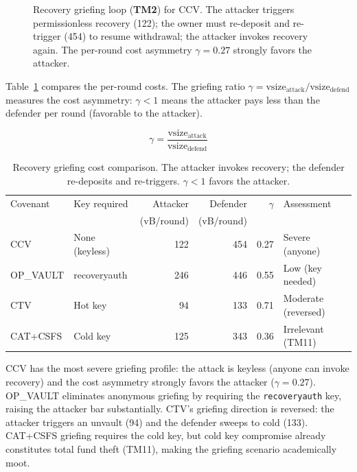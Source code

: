 \begin{figure}[t]
{}
\caption{Recovery griefing loop (\textbf{TM2}) for CCV. The attacker triggers
permissionless recovery (122\vB{}); the owner must re-deposit and re-trigger
(454\vB{}) to resume withdrawal; the attacker invokes recovery again. The
per-round cost asymmetry $\gamma = 0.27$ strongly favors the attacker.}
\label{fig:recovery_griefing}
\end{figure}

Table~\ref{tab:griefing_costs} compares the per-round costs. The griefing ratio
$\gamma = \text{vsize}_{\text{attack}} / \text{vsize}_{\text{defend}}$ measures the
cost asymmetry: $\gamma < 1$ means the attacker pays less than the defender per
round (favorable to the attacker).

\begin{equation} \label{eq:griefing_ratio}
\gamma = \frac{\text{vsize}_{\text{attack}}}{\text{vsize}_{\text{defend}}}
\end{equation}

\begin{table}[t]
\centering
\caption{Recovery griefing cost comparison. The attacker invokes recovery; the
defender re-deposits and re-triggers. $\gamma < 1$ favors the attacker.}
\label{tab:griefing_costs}
\small
\begin{tabular}{@{}llrrrl@{}}
\toprule
Covenant & Key required & Attacker & Defender & $\gamma$ & Assessment \\
         &              & (vB/round) & (vB/round) & & \\
\midrule
CCV       & None (keyless)  & 122 & 454 & 0.27 & Severe (anyone) \\
OP\_VAULT & recoveryauth    & 246 & 446 & 0.55 & Low (key needed) \\
CTV       & Hot key         & 94  & 133 & 0.71 & Moderate (reversed) \\
CAT+CSFS  & Cold key        & 125 & 343 & 0.36 & Irrelevant (TM11) \\
\bottomrule
\end{tabular}
\end{table}

CCV has the most severe griefing profile: the attack is keyless (anyone can invoke
recovery) and the cost asymmetry strongly favors the attacker ($\gamma = 0.27$).
OP\_VAULT eliminates anonymous griefing by requiring the \texttt{recoveryauth} key,
raising the attacker bar substantially. CTV's griefing direction is reversed: the
attacker triggers an unvault (94\vB{}) and the defender sweeps to cold (133\vB{}).
CAT+CSFS griefing requires the cold key, but cold key compromise already constitutes
total fund theft (TM11), making the griefing scenario academically moot.

